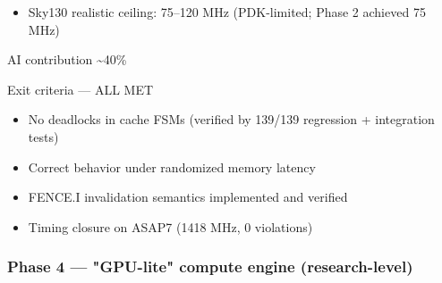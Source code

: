 \begin{record}
\begin{itemize}
  \begin{itemize}
  \tightlist
  \item
    \textbf{1418 MHz fmax}, 27.27 mW power, 3,844 µm² stdcell area
  \item
    \textbf{0 DRC, 0 antenna violations}, +5.97 ps setup slack, +22.54
    ps hold slack
  \item
    \warn{} Timing/\allowbreak{}power unvalidated post-bead-
    (STA-zero-wire defect, 2026-09-16); Run 43 artifacts wiped, not
    re-checkable --- bead 
  \item
    Full run history: \cref{cr:run:asap7}
  \end{itemize}
\item
  Sky130 realistic ceiling: 75--120 MHz (PDK-limited; Phase 2 achieved
  75 MHz)
\end{itemize}

\notemark{} AI contribution \textasciitilde40\%

\ok{} Exit criteria --- ALL MET

\begin{itemize}
\tightlist
\item
  \ok{} No deadlocks in cache FSMs (verified by 139/139 regression +
  integration tests)
\item
  \ok{} Correct behavior under randomized memory latency
\item
  \ok{} FENCE.I invalidation semantics implemented and verified
\item
  \ok{} Timing closure on ASAP7 (1418 MHz, 0 violations)
\end{itemize}

\end{record}

\subsubsection{Phase 4 --- "GPU-lite" compute engine (research-level)}\label{cr:status:roadmap:phase-4-gpu-lite-compute-engine-research-level}

